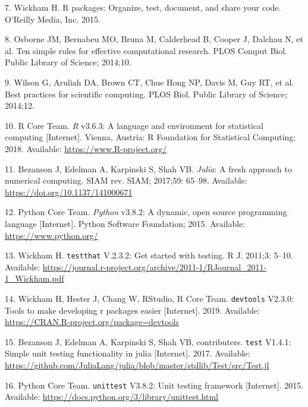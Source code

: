 \documentclass[10pt,letterpaper]{article}
\begin{document}
\leavevmode\hypertarget{ref-wickham2015r}{}%
7. Wickham H. R packages: Organize, test, document, and share your code. O'Reilly Media, Inc. 2015.

\leavevmode\hypertarget{ref-osborne2014ten}{}%
8. Osborne JM, Bernabeu MO, Bruna M, Calderhead B, Cooper J, Dalchau N, et al. Ten simple rules for effective computational research. PLOS Comput Biol. Public Library of Science; 2014;10.

\leavevmode\hypertarget{ref-wilson2014best}{}%
9. Wilson G, Aruliah DA, Brown CT, Chue Hong NP, Davis M, Guy RT, et al. Best practices for scientific computing. PLOS Biol. Public Library of Science; 2014;12.

\leavevmode\hypertarget{ref-R}{}%
10. R Core Team. \emph{R} v3.6.3: A language and environment for statistical computing {[}Internet{]}. Vienna, Austria: R Foundation for Statistical Computing; 2018. Available: \url{https://www.R-project.org/}

\leavevmode\hypertarget{ref-bezanson2017julia}{}%
11. Bezanson J, Edelman A, Karpinski S, Shah VB. \emph{Julia}: A fresh approach to numerical computing. SIAM rev. SIAM; 2017;59: 65--98. Available: \url{https://doi.org/10.1137/141000671}

\leavevmode\hypertarget{ref-python}{}%
12. Python Core Team. \emph{Python} v3.8.2: A dynamic, open source programming language {[}Internet{]}. Python Software Foundation; 2015. Available: \url{https://www.python.org/}

\leavevmode\hypertarget{ref-testthat}{}%
13. Wickham H. \texttt{testthat} V.2.3.2: Get started with testing. R J. 2011;3: 5--10. Available: \url{https://journal.r-project.org/archive/2011-1/RJournal_2011-1_Wickham.pdf}

\leavevmode\hypertarget{ref-devtools}{}%
14. Wickham H, Hester J, Chang W, RStudio, R Core Team. \texttt{devtools} V2.3.0: Tools to make developing r packages easier {[}Internet{]}. 2019. Available: \url{https://CRAN.R-project.org/package=devtools}

\leavevmode\hypertarget{ref-juliatest}{}%
15. Bezanson J, Edelman A, Karpinski S, Shah VB, contributers. \texttt{test} V1.4.1: Simple unit testing functionality in julia {[}Internet{]}. 2017. Available: \url{https://github.com/JuliaLang/julia/blob/master/stdlib/Test/src/Test.jl}

\leavevmode\hypertarget{ref-pythonunittest}{}%
16. Python Core Team. \texttt{unittest} V3.8.2: Unit testing framework {[}Internet{]}. 2015. Available: \url{https://docs.python.org/3/library/unittest.html}

\nolinenumbers
\end{document}

